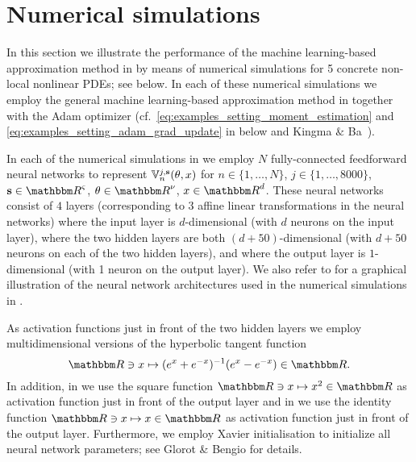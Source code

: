 \section{Numerical simulations}
\label{sec:examples}
In this section we illustrate the performance of the machine learning-based approximation method in  by means of numerical simulations for 5 concrete non-local nonlinear PDEs; see  below. In each of these numerical simulations we employ the general machine learning-based approximation method in  together with the Adam optimizer (cf.\ \eqref{eq:examples_setting_moment_estimation} and \eqref{eq:examples_setting_adam_grad_update} in  below and Kingma $\&$ Ba~\cite{Kingma2014}).

In each of the numerical simulations in  we employ
$ N $
fully-connected feedforward neural networks to represent
$
\bV^{j,{\textbf s}}_n(\theta,x) %
$
for $ n \in \{ 1, \dots, N\} $,
$ j \in \{ 1, \dots, 8000 \} $,
$ {\textbf s} \in \R^{\varsigma}$,
$ \theta \in \R^{ \nu } $,
$x \in \R^d$.
%
These neural networks consist of
$ 4 $ layers (corresponding to 3 affine linear transformations in the neural networks) where
the input layer is $d$-dimensional (with $ d $ neurons on the input layer), where
the two hidden layers are both $(d+50)$-dimensional (with $d+50$ neurons on each of the two hidden layers), and where the output layer is $1$-dimensional (with 1 neuron on the output layer).
We also refer to  for a graphical illustration of the neural network architectures used in the numerical simulations in .

As activation functions just in front of the two hidden layers we employ multidimensional versions of the hyperbolic tangent function
\begin{equation}
	\R \ni x \mapsto (e^x + e^{-x})^{-1} (e^{x} - e^{-x}) \in \R.
\end{equation}
In addition, in  we use the square function 
$
\R \ni x \mapsto x^2 \in \R
$
as activation function just in front of the output layer and in  we use the identity function 
$
\R \ni x \mapsto x \in \R
$
as activation function just in front of the output layer.
Furthermore, we employ Xavier initialisation to initialize all neural network parameters; see Glorot \& Bengio \cite{glorot2010} for details.
%
%

